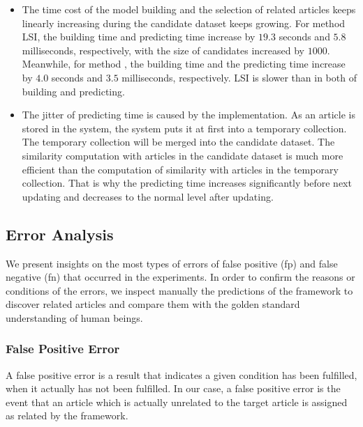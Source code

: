 \begin{itemize}
    \item The time cost of the model building and the selection of related articles keeps linearly increasing during the candidate dataset keeps growing. For method LSI, the building time and predicting time increase by $19.3$ seconds and $5.8$ milliseconds, respectively, with the size of candidates increased by $1000$. Meanwhile, for method \tfidf{}, the building time and the predicting time increase by $4.0$ seconds and $3.5$ milliseconds, respectively. LSI is slower than \tfidf{} in both of building and predicting. 
    \item The jitter of predicting time is caused by the implementation. As an article is stored in the system, the system puts it at first into a temporary collection. The temporary collection will be merged into the candidate dataset. The similarity computation with articles in the candidate dataset is much more efficient than the computation of similarity with articles in the temporary collection. That is why the predicting time increases significantly before next updating and decreases to the normal level after updating. 
    
\end{itemize}

\bigbreak

\subsection{Error Analysis}
\label{sec:5.5}

We present insights on the most types of errors of false positive (fp) and false negative (fn) that occurred in the experiments. In order to confirm the reasons or conditions of the errors, we inspect manually the predictions of the framework to discover related articles and compare them with the golden standard understanding of human beings.  

\subsubsection{False Positive Error}

A false positive error is a result that indicates a given condition has been fulfilled, when it actually has not been fulfilled. In our case, a false positive error is the event that an article which is actually unrelated to the target article is assigned as related by the framework. 

